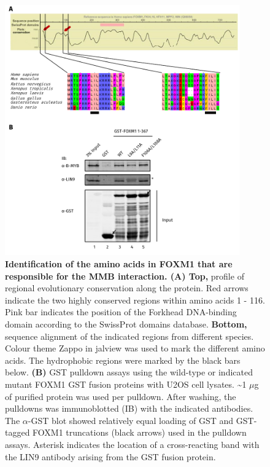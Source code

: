 \begin{figure}[!h]
    \centering
    \includegraphics[width=0.9\textwidth]{chapter3/figures_foxm1/fig33.pdf}
    \caption[Identification of the amino acids in FOXM1 that are responsible for the MMB interaction]{\textbf{Identification of the amino acids in FOXM1 that are responsible for the MMB interaction. (A) Top,} profile of regional evolutionary conservation along the protein. Red arrows indicate the two highly conserved regions within amino acids 1 - 116. Pink bar indicates the position of the Forkhead DNA-binding domain according to the SwissProt domains database. \textbf{Bottom,}  sequence alignment of the indicated regions from different species. Colour theme Zappo in jalview was used to mark the different amino acids. The hydrophobic regions were marked by the black bars below. \textbf{(B)} GST pulldown assays using the wild-type or indicated mutant FOXM1 GST fusion proteins with U2OS cell lysates. \textasciitilde 1 $\mu$g of purified protein was used per pulldown. After washing, the pulldowns was immunoblotted (IB) with the indicated antibodies. The $\alpha$-GST blot showed relatively equal loading of GST and GST-tagged FOXM1 truncations (black arrows) used in the pulldown assays. Asterisk indicates the location of a cross-reacting band with the LIN9 antibody arising from the GST fusion protein.}
    \label{fig:fig33}
\end{figure}

